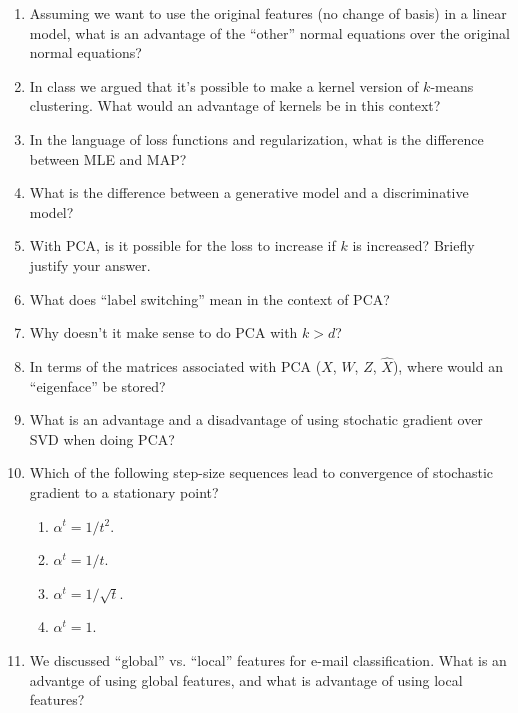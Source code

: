 \documentclass{article}
\def\enum#1{\begin{enumerate}#1\end{enumerate}}
\begin{document}
\enum{
\item Assuming we want to use the original features (no change of basis) in a linear model, what is an advantage of the ``other'' normal equations over the original normal equations?
\item In class we argued that it's possible to make a kernel version of $k$-means clustering. What would an advantage of kernels be in this context?
\item In the language of loss functions and regularization, what is the difference between MLE and MAP?
\item What is the difference between a generative model and a discriminative model?
\item With PCA, is it possible for the loss to increase if $k$ is increased? Briefly justify your answer.
\item What does ``label switching'' mean in the context of PCA?
\item Why doesn't it make sense to do PCA with $k > d$?
\item In terms of the matrices associated with PCA ($X$, $W$, $Z$, $\hat{X}$), where would an ``eigenface'' be stored?
\item What is an advantage and a disadvantage of using stochatic gradient over SVD when doing PCA?
\item Which of the following step-size sequences lead to convergence of stochastic gradient to a stationary point?
\enum{
\item $\alpha^t = 1/t^2$.
\item $\alpha^t = 1/t$.
\item $\alpha^t = 1/\sqrt{t}$.
\item $\alpha^t = 1$.
}
\item We discussed ``global'' vs. ``local'' features for e-mail classification. What is an advantge of using global features, and what is advantage of using local features?
}
\end{document}
